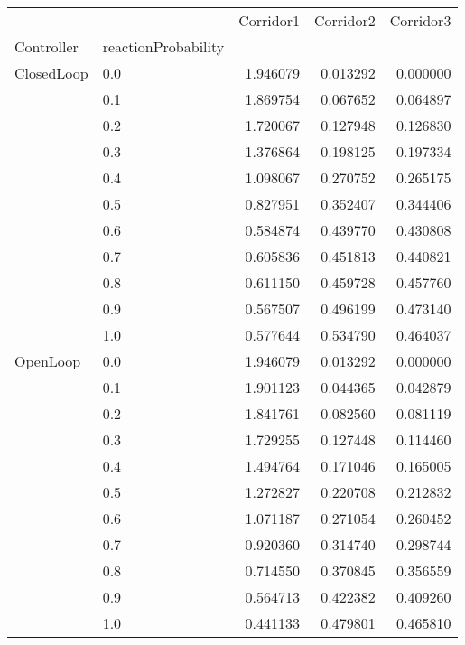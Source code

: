 \begin{tabular}{llrrr}
\toprule
         &     &  Corridor1 &  Corridor2 &  Corridor3 \\
Controller & reactionProbability &            &            &            \\
\midrule
ClosedLoop & 0.0 &   1.946079 &   0.013292 &   0.000000 \\
         & 0.1 &   1.869754 &   0.067652 &   0.064897 \\
         & 0.2 &   1.720067 &   0.127948 &   0.126830 \\
         & 0.3 &   1.376864 &   0.198125 &   0.197334 \\
         & 0.4 &   1.098067 &   0.270752 &   0.265175 \\
         & 0.5 &   0.827951 &   0.352407 &   0.344406 \\
         & 0.6 &   0.584874 &   0.439770 &   0.430808 \\
         & 0.7 &   0.605836 &   0.451813 &   0.440821 \\
         & 0.8 &   0.611150 &   0.459728 &   0.457760 \\
         & 0.9 &   0.567507 &   0.496199 &   0.473140 \\
         & 1.0 &   0.577644 &   0.534790 &   0.464037 \\
OpenLoop & 0.0 &   1.946079 &   0.013292 &   0.000000 \\
         & 0.1 &   1.901123 &   0.044365 &   0.042879 \\
         & 0.2 &   1.841761 &   0.082560 &   0.081119 \\
         & 0.3 &   1.729255 &   0.127448 &   0.114460 \\
         & 0.4 &   1.494764 &   0.171046 &   0.165005 \\
         & 0.5 &   1.272827 &   0.220708 &   0.212832 \\
         & 0.6 &   1.071187 &   0.271054 &   0.260452 \\
         & 0.7 &   0.920360 &   0.314740 &   0.298744 \\
         & 0.8 &   0.714550 &   0.370845 &   0.356559 \\
         & 0.9 &   0.564713 &   0.422382 &   0.409260 \\
         & 1.0 &   0.441133 &   0.479801 &   0.465810 \\
\bottomrule
\end{tabular}
